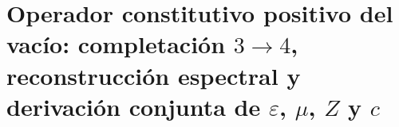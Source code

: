 \chapter{Operador constitutivo positivo del vacío: completación \(3\to4\), reconstrucción espectral y derivación conjunta de \(\varepsilon\), \(\mu\), \(Z\) y \(c\)}
\label{chap:p3-final:39:vacio_constitutivo}


